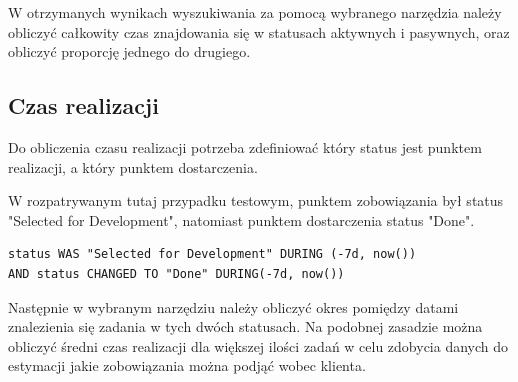 W otrzymanych wynikach wyszukiwania za pomocą wybranego narzędzia należy obliczyć całkowity czas znajdowania się w statusach aktywnych i pasywnych, oraz obliczyć proporcję jednego do drugiego.

\subsection{Czas realizacji}
Do obliczenia czasu realizacji potrzeba zdefiniować który status jest punktem realizacji, a który punktem dostarczenia.

W rozpatrywanym tutaj przypadku testowym, punktem zobowiązania był status "Selected for Development", natomiast punktem dostarczenia status "Done".
\begin{lstlisting}[caption=Zapytanie JQL pozwalające obliczyć czas dostarczenia w przeciągu ostatniego tygodnia]
status WAS "Selected for Development" DURING (-7d, now())
AND status CHANGED TO "Done" DURING(-7d, now())
\end{lstlisting}

Następnie w wybranym narzędziu należy obliczyć okres pomiędzy datami znalezienia się zadania w tych dwóch statusach.
Na podobnej zasadzie można obliczyć średni czas realizacji dla większej ilości zadań w celu zdobycia danych do estymacji jakie zobowiązania można podjąć wobec klienta.
